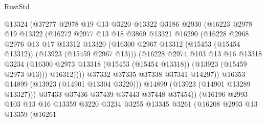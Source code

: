 \begin{lexlean}{RustStd}
\begin{coremodule}
                        @13324
                        (@37277
                          @2978
                          @19
                          @13
                          @3220
                          @13322
                          @3186
                          @2930
                          (@16223
                            @2978
                            @19
                            @13322
                            (@16272
                              @2977
                              @13
                              @18
                              @3869
                              @13321
                              @16290
                              (@16228
                                @2968
                                @2976
                                @13
                                @17
                                @13312
                                @13320
                                (@16300
                                  @2967
                                  @13312
                                  (@15453 (@15454 @13312))
                                  (@13923 (@15459 @2967 @13)))
                                (@16228
                                  @2974
                                  @103
                                  @13
                                  @16
                                  @13318
                                  @3234
                                  (@16300
                                    @2973
                                    @13318
                                    (@15453 (@15454 @13318))
                                    (@13923 (@15459 @2973 @13)))
                                  @16312))))
                          @37332
                          @37335
                          @37338
                          @37341
                          @14297))
                      @16353
                      @14899
                      (@13923 (@14901 @13304 @3220)))
                    @14899
                    (@13923 (@14901 @13289 @13327)))
                  @37433
                  @37436
                  @37439
                  @37443
                  @37448
                  @37454))
              (@16196
                @2993
                @103
                @13
                @16
                @13359
                @3220
                @3234
                @3255
                @13345
                @3261
                (@16208
                  @2993
                  @13
                  @13359
                  (@16261

\end{coremodule}
\end{lexlean}
